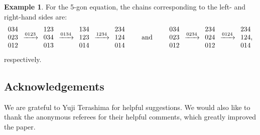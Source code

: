 \documentclass[pdftex]{sigma}
\numberwithin{equation}{section}
\theoremstyle{definition}
\newtheorem{Example}[Theorem]{Example}
\begin{document}
\begin{Example}
 For the 5-gon equation, the chains corresponding to the left- and right-hand sides are:
 \begin{equation*}
 \begin{array}{@{}c@{\;}c@{\;}c@{\;}c@{\;}c@{\;}c@{\;}c}
 \begin{array}{c}
 034\\
 023\\
 012
 \end{array}
 &
 \xrightarrow{0123}
 &
 \begin{array}{c}
 123\\
 034\\
 013
 \end{array}
 &
 \xrightarrow{0134}
 &
 \begin{array}{c}
 134\\
 123\\
 014
 \end{array}
 &
 \xrightarrow{1234}
 &
 \begin{array}{c@{}}
 234\\
 124\\
 014
 \end{array}
 \end{array}
 \qquad\text{and}\qquad
 \begin{array}{@{}c@{\;}c@{\;}c@{\;}c@{\;}c}
 \begin{array}{c}
 034\\
 023\\
 012
 \end{array}
 &
 \xrightarrow{0234}
 &
 \begin{array}{c}
 234\\
 024\\
 012
 \end{array}
 &
 \xrightarrow{0124}
 &
 \begin{array}{c@{}}
 234\\
 124\\
 014
 \end{array},
 \end{array}
 \end{equation*}
 respectively.
\end{Example}

\subsection*{Acknowledgements}

We are grateful to Yuji Terashima for helpful suggestions. We would also like to thank the anonymous referees for their helpful comments, which greatly improved the paper.
\end{document}
